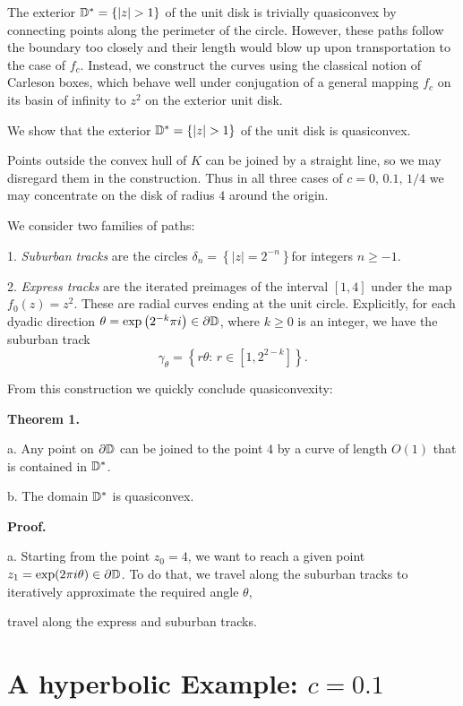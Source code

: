 \documentclass[hebrew,english]{article}
\begin{document}
The exterior $\D^{*}=\left\{ \left|z\right|>1\right\} $ of the unit
disk is trivially quasiconvex by connecting points along the perimeter
of the circle. However, these paths follow the boundary too closely
and their length would blow up upon transportation to the case of
$f_{c}$. Instead, we construct the curves using the classical notion
of Carleson boxes, which behave well under conjugation of a general
mapping $f_{c}$ on its basin of infinity to $z^{2}$ on the exterior
unit disk.

We show that the exterior $\D^{*}=\left\{ \left|z\right|>1\right\} $
of the unit disk is quasiconvex.  

Points outside the convex hull of $K$ can be joined by a straight
line, so we may disregard them in the construction. Thus in all three
cases of $c=0,\,0.1,\,1/4$ we may concentrate on the disk of radius
$4$ around the origin.

We consider two families of paths: 

1. \emph{Suburban tracks }are the circles $\delta_{n}=\left\{ \left|z\right|=2^{-n}\right\} $for
integers $n\geq-1$.

2. \emph{Express tracks} are the iterated preimages of the interval
$\left[1,4\right]$ under the map $f_{0}(z)=z^{2}$. These are radial
curves ending at the unit circle. Explicitly, for each dyadic direction
$\theta=\exp\left(2^{-k}\pi i\right)\in\partial\mathbb{D}$, where $k\geq0$
is an integer, we have the suburban track 
\[
\gamma_{\theta}=\left\{ r\theta:\,r\in\left[1,2^{2-k}\right]\right\} .
\]

From this construction we quickly conclude quasiconvexity:

\textbf{Theorem 1. }

a. Any point on $\partial\mathbb{D}$ can be joined to the point $4$ by a
curve of length $O(1)$ that is contained in $\mathbb{D}^{*}$.

b. The domain $\mathbb{D}^{*}$ is quasiconvex.

\textbf{Proof.}

a. Starting from the point $z_{0}=4$, we want to reach a given point
$z_{1}=\exp(2\pi i\theta)\in\partial\mathbb{D}$. To do that, we travel along
the suburban tracks to iteratively approximate the required angle
$\theta$, 

travel along the express and suburban tracks.

\section{A hyperbolic Example: $c=0.1$}
\end{document}
